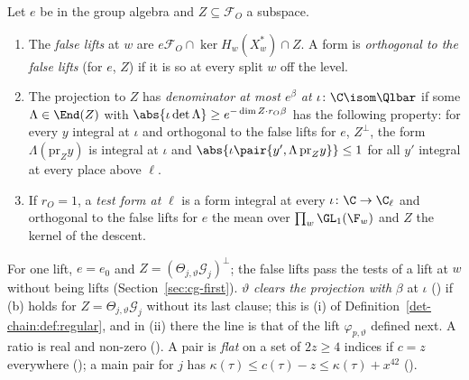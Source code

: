 \begin{definition}\label{ol-values:def:false}
Let $e$ be in the group algebra and $Z\subseteq\mathcal F_O$ a subspace.
\begin{enumerate}[label=(\alph*)]
\item The \emph{false lifts} at $w$ are $e\mathcal F_O\cap\ker H_w(X^*_w)\cap Z$. A form is
  \emph{orthogonal to the false lifts} (for $e$, $Z$) if it is so at every split $w$ off the level.
\item The projection to $Z$ has \emph{denominator at most $e^\beta$ at} $\iota\colon\C\isom\Qlbar$
  if some $\Lambda\in\End(Z)$ with $\abs{\iota\det\Lambda}\ge e^{-\dim Z\cdot r_O\beta}$ has the
  following property: for every $y$ integral at $\iota$ and orthogonal to the false lifts for $e$,
  $Z^\perp$, the form $\Lambda(\mathrm{pr}_Zy)$ is integral at $\iota$ and
  $\abs{\iota\pair{y',\Lambda\,\mathrm{pr}_Zy}}\le1$ for all $y'$ integral at every place above
  $\ell$.
\item If $r_O=1$, a \emph{test form at} $\ell$ is a form integral at every $\iota\colon\C\to\C_\ell$
  and orthogonal to the false lifts for $e$ the mean over $\prod_w\GL_1(\F_w)$ and $Z$ the
  kernel of the descent.
\end{enumerate}
\end{definition}

For one lift, $e=e_0$ and $Z=(\Theta_{j,\vartheta}\mathcal G_j)^\perp$; the false lifts pass the
tests of a lift at $w$ without being lifts (Section~\ref{sec:cg-first}). $\vartheta$ \emph{clears the
projection with} $\beta$ at $\iota$ () if (b) holds for
$Z=\Theta_{j,\vartheta}\mathcal G_j$ without its last clause; this is (i) of
Definition~\ref{det-chain:def:regular}, and in (ii) there the line is that of the lift
$\varphi_{p,\vartheta}$ defined next. A ratio is real and
non-zero (). A pair is \emph{flat} on a set of $2z\ge4$
indices if $c=z$ everywhere (); a main pair for $j$ has
$\kappa(\tau)\le c(\tau)-z\le\kappa(\tau)+x^{42}$
().

